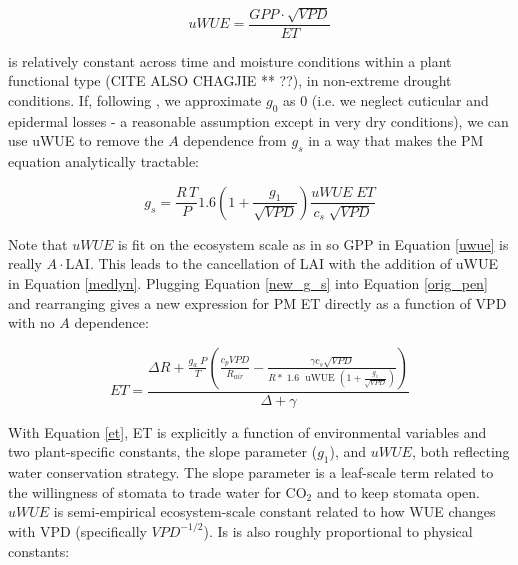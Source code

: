 \documentclass[draft,linenumbers]{gcbjournal}
\begin{document}
\begin{linenomath*}
  \begin{equation}
    uWUE = \frac{GPP \cdot \sqrt{VPD}}{ET}
    \label{uwue}
  \end{equation}
\end{linenomath*}
is relatively constant across time and moisture conditions within a plant functional type (CITE ALSO CHAGJIE ** ??), in non-extreme drought conditions. If, following \citet{Lin_2015}, we approximate $g_0$ as $0$ (i.e. we neglect cuticular and epidermal losses - a reasonable assumption except in very dry conditions), we can use uWUE to remove the $A$ dependence from $g_s$ in a way that makes the PM equation analytically tractable:

\begin{linenomath*}
  \begin{equation}
    g_s = \frac{R \, T}{P} 1.6 \left(1 + \frac{g_1}{\sqrt{VPD}}\right) \frac{uWUE \; ET}{c_s \; \sqrt{VPD}}
    \label{new_g_s}
  \end{equation}
\end{linenomath*}

Note that $uWUE$ is fit on the ecosystem scale as in \citet{Zhou_2015} so GPP in Equation \ref{uwue} is really $A\cdot \text{LAI}$. This leads to the cancellation of LAI with the addition of uWUE in Equation \ref{medlyn}. Plugging Equation \ref{new_g_s} into Equation \ref{orig_pen} and rearranging gives a new expression for PM ET directly as a function of VPD with no $A$ dependence:

\begin{linenomath*}
  \begin{equation}
    ET = \frac{\Delta R + \frac{g_a\; P}{T} \left( \frac{ c_p VPD}{R_{air}} -  \frac{\gamma c_s \sqrt{VPD} }{ R* \; 1.6\; \text{ uWUE } (1 + \frac{g_1}{\sqrt{VPD}})} \right) }{ \Delta + \gamma}
    \label{et}
  \end{equation}
\end{linenomath*}

With Equation \ref{et}, ET is explicitly a function of environmental variables and two plant-specific constants, the slope parameter ($g_1$), and $uWUE$, both reflecting water conservation strategy. The slope parameter is a leaf-scale term related to the willingness of stomata to trade water for CO$_2$ and to keep stomata open. $uWUE$ is semi-empirical ecosystem-scale constant related to how WUE changes with VPD (specifically $VPD^{-1/2}$). Is is also roughly proportional to physical constants:
\end{document}
